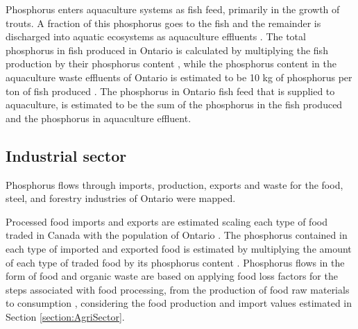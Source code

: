 \documentclass[authoryear]{elsarticle}
\begin{document}
Phosphorus enters aquaculture systems as fish feed, primarily in the growth of trouts. A fraction of this phosphorus goes to the fish and the remainder is discharged into aquatic ecosystems as aquaculture effluents
\citep{OntarioAquaculture}. 
The total phosphorus in fish produced in Ontario
is calculated by multiplying the fish production \citep{StatisticsCanadaAquaculture} by their phosphorus content \citep{CanadianNutrientFile}, while the phosphorus content in the aquaculture waste effluents of Ontario is estimated to be 10 kg of phosphorus per ton of fish produced \citep{bureau2003chemical}. The phosphorus in Ontario fish feed that is supplied to aquaculture, is estimated to be the sum of the phosphorus in the fish produced and the phosphorus in aquaculture effluent.

\subsection{Industrial sector}
Phosphorus flows through imports, production, exports and waste for the food, steel, and forestry industries of Ontario were mapped.

Processed food imports and exports
are estimated scaling each type of food 
traded in Canada \citep{TradeDataOnlineCanada}
with the population of Ontario \citep{PopulationCanada}.
The phosphorus contained in each type of imported and exported food is estimated by multiplying the amount of each type of traded food by its phosphorus content \citep{CanadianNutrientFile}. Phosphorus flows in the form of food and organic waste are based on applying food loss factors for the steps associated with food processing, from the production of food raw materials to consumption \citep{FoodLossesFAO}, considering the food production and import values estimated in Section \ref{section:AgriSector}.
\end{document}
